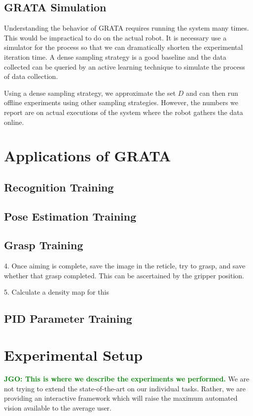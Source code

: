 \documentclass[conference]{IEEEtran}
\newcommand{\jgonote}[1]{\textcolor{Green}{\textbf{JGO: #1}}}
\begin{document}
\subsection{GRATA Simulation}
Understanding the behavior of GRATA requires running the system many times. This would be impractical
to do on the actual robot. It is necessary use a simulator for the process so that we can dramatically shorten the
experimental iteration time. A dense sampling strategy is a good baseline and the data collected can
be queried by an active learning technique to simulate the process of data collection.

Using a dense sampling strategy, we approximate the set $D$ and can then run offline experiments using other
sampling strategies. However, the numbers we report are on actual executions of the system where
the robot gathers the data online.


\section{Applications of GRATA}

\subsection{Recognition Training}

\subsection{Pose Estimation Training}

\subsection{Grasp Training}
4. Once aiming is complete, save the image in the reticle, try to grasp, and save whether that grasp completed.
This can be ascertained by the gripper position.

5. Calculate a density map for this 

\subsection{PID Parameter Training}


\section{Experimental Setup}
\jgonote{This is where we describe the experiments we performed.}
We are not trying to extend the state-of-the-art on our individual tasks. Rather,
we are providing an interactive framework which will raise the maximum automated vision
available to the average user.
\end{document}
